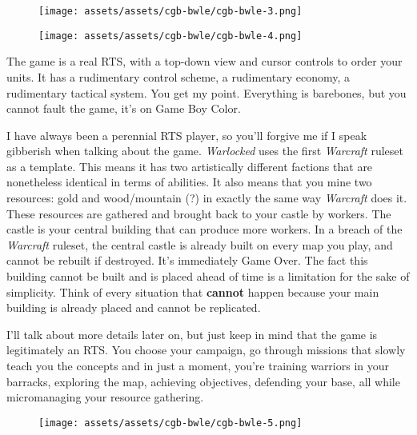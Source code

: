 \documentclass{book}
\begin{document}
\begin{figure}[hbt]
\vskip 10pt
\centering \texttt{[image: assets/assets/cgb-bwle/cgb-bwle-3.png]}
\vskip 6pt
\end{figure}
\begin{figure}[hbt]
\vskip 10pt
\centering \texttt{[image: assets/assets/cgb-bwle/cgb-bwle-4.png]}
\vskip 6pt
\end{figure}

The game is a real RTS, with a top-down view and cursor controls to order your units. It has a rudimentary control scheme, a rudimentary economy, a rudimentary tactical system. You get my point. Everything is barebones, but you cannot fault the game, it’s on Game Boy Color.

I have always been a perennial RTS player, so you’ll forgive me if I speak gibberish when talking about the game. \emph{Warlocked} uses the first \emph{Warcraft} ruleset as a template. This means it has two artistically different factions that are nonetheless identical in terms of abilities. It also means that you mine two resources: gold and wood/mountain (?) in exactly the same way \emph{Warcraft} does it. These resources are gathered and brought back to your castle by workers. The castle is your central building that can produce more workers. In a breach of the \emph{Warcraft} ruleset, the central castle is already built on every map you play, and cannot be rebuilt if destroyed. It’s immediately Game Over. The fact this building cannot be built and is placed ahead of time is a limitation for the sake of simplicity. Think of every situation that \textbf{cannot} happen because your main building is already placed and cannot be replicated.

I’ll talk about more details later on, but just keep in mind that the game is legitimately an RTS. You choose your campaign, go through missions that slowly teach you the concepts and in just a moment, you’re training warriors in your barracks, exploring the map, achieving objectives, defending your base, all while micromanaging your resource gathering.

\begin{figure}[hbt]
\vskip 10pt
\centering \texttt{[image: assets/assets/cgb-bwle/cgb-bwle-5.png]}
\vskip 6pt
\end{figure}
\end{document}
